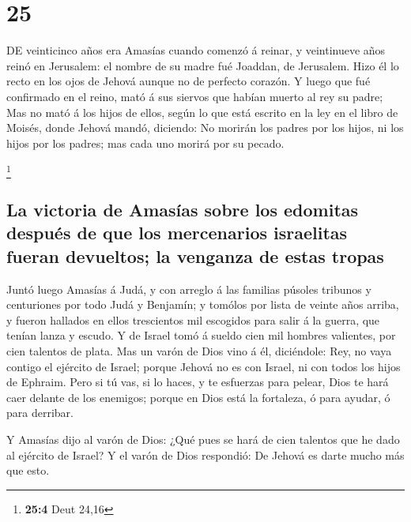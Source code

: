 \hypertarget{section-24}{%
\section{25}\label{section-24}}

 DE veinticinco años era Amasías cuando comenzó á reinar,
y veintinueve años reinó en Jerusalem: el nombre de su madre fué
Joaddan, de Jerusalem.  Hizo él lo recto en los ojos de
Jehová aunque no de perfecto corazón.  Y luego que fué
confirmado en el reino, mató á sus siervos que habían muerto al rey su
padre;  Mas no mató á los hijos de ellos, según lo que
está escrito en la ley en el libro de Moisés, donde Jehová mandó,
diciendo: No morirán los padres por los hijos, ni los hijos por los
padres; mas cada uno morirá por su pecado.

\footnote{\textbf{25:4} Deut 24,16}

\hypertarget{la-victoria-de-amasuxedas-sobre-los-edomitas-despuuxe9s-de-que-los-mercenarios-israelitas-fueran-devueltos-la-venganza-de-estas-tropas}{%
\subsection{La victoria de Amasías sobre los edomitas después de que los
mercenarios israelitas fueran devueltos; la venganza de estas
tropas}\label{la-victoria-de-amasuxedas-sobre-los-edomitas-despuuxe9s-de-que-los-mercenarios-israelitas-fueran-devueltos-la-venganza-de-estas-tropas}}

 Juntó luego Amasías á Judá, y con arreglo á las familias
púsoles tribunos y centuriones por todo Judá y Benjamín; y tomólos por
lista de veinte años arriba, y fueron hallados en ellos trescientos mil
escogidos para salir á la guerra, que tenían lanza y escudo.
 Y de Israel tomó á sueldo cien mil hombres valientes, por
cien talentos de plata.  Mas un varón de Dios vino á él,
diciéndole: Rey, no vaya contigo el ejército de Israel; porque Jehová no
es con Israel, ni con todos los hijos de Ephraim.  Pero si
tú vas, si lo haces, y te esfuerzas para pelear, Dios te hará caer
delante de los enemigos; porque en Dios está la fortaleza, ó para
ayudar, ó para derribar.

 Y Amasías dijo al varón de Dios: ¿Qué pues se hará de
cien talentos que he dado al ejército de Israel? Y el varón de Dios
respondió: De Jehová es darte mucho más que esto.

